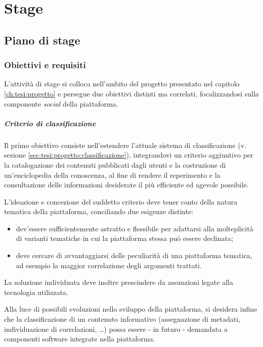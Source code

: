 \chapter{Stage}
\label{ch:tesi:stage}

\section{Piano di stage}
\label{sec:tesi:stage:piano}

\subsection{Obiettivi e requisiti}
\label{sec:tesi:stage:piano:obiettivi}
L'attività di stage si colloca nell'ambito del progetto presentato nel capitolo \ref{ch:tesi:progetto} e persegue due obiettivi distinti ma correlati, focalizzandosi sulla componente \textit{social} della piattaforma.

\paragraph{Criterio di classificazione}
Il primo obiettivo consiste nell'estendere l'attuale sistema di classificazione (v. sezione \ref{sec:tesi:progetto:classificazione}), integrandovi un criterio aggiuntivo per la catalogazione dei contenuti pubblicati dagli utenti e la costruzione di un'enciclopedia della conoscenza, al fine di rendere il reperimento e la consultazione delle informazioni desiderate il più efficiente ed agevole possibile.

L'ideazione e concezione del suddetto criterio deve tener conto della natura tematica della piattaforma, conciliando due esigenze distinte:
\begin{itemize}
\item dev'essere sufficientemente astratto e flessibile per adattarsi alla molteplicità di varianti tematiche in cui la piattaforma stessa può essere declinata;
\item deve cercare di avvantaggiarsi delle peculiarità di una piattaforma tematica, ad esempio la maggior correlazione degli argomenti trattati.
\end{itemize}

La soluzione individuata deve inoltre prescindere da assunzioni legate alla tecnologia utilizzata.

Alla luce di possibili evoluzioni nello sviluppo della piattaforma, si desidera infine che la classificazione di un contenuto informativo (assegnazione di metadati, individuazione di correlazioni, \ldots) possa essere - in futuro - demandata a componenti software integrate nella piattaforma.

